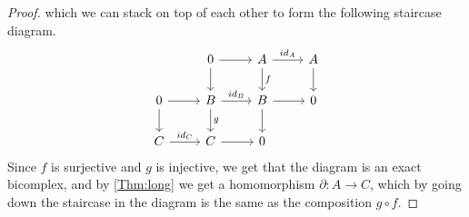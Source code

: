 \begin{proof}
which we can stack on top of each other to form the following staircase diagram.
\begin{equation*}
    \begin{tikzcd}
                      & 0 \arrow[r] \arrow[d]              & A \arrow[r, "id_A"] \arrow[d, "f"] & A \arrow[d] \\
0 \arrow[r] \arrow[d] & B \arrow[r, "id_B"] \arrow[d, "g"] & B \arrow[d] \arrow[r]              & 0           \\
C \arrow[r, "id_C"]   & C \arrow[r]                        & 0                                  &            
\end{tikzcd}
\end{equation*}
Since $f$ is surjective and $g$ is injective, we get that the diagram is an exact bicomplex, and by \cref{Thm:long} we get a homomorphism $\partial :A \longrightarrow C$, which by going down the staircase in the diagram is the same as the composition $g\circ f$. 


\end{proof}

